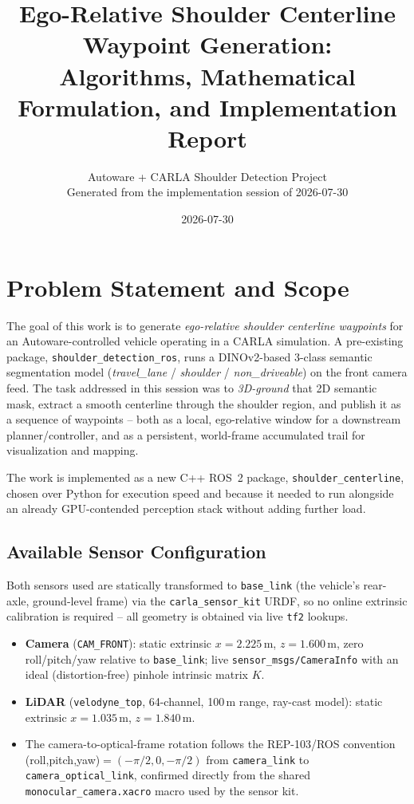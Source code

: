 \documentclass[11pt]{article}
\title{Ego-Relative Shoulder Centerline Waypoint Generation:\\
Algorithms, Mathematical Formulation, and Implementation Report}
\author{Autoware + CARLA Shoulder Detection Project \\ \small Generated from the implementation session of 2026-07-30}
\date{2026-07-30}
\newcommand{\code}[1]{\texttt{#1}}
\begin{document}
\maketitle
\tableofcontents

\section{Problem Statement and Scope}

The goal of this work is to generate \emph{ego-relative shoulder centerline waypoints} for an
Autoware-controlled vehicle operating in a CARLA simulation. A pre-existing package,
\code{shoulder\_detection\_ros}, runs a DINOv2-based 3-class semantic segmentation model
(\emph{travel\_lane} / \emph{shoulder} / \emph{non\_driveable}) on the front camera feed. The task
addressed in this session was to \emph{3D-ground} that 2D semantic mask, extract a smooth
centerline through the shoulder region, and publish it as a sequence of waypoints -- both as a
local, ego-relative window for a downstream planner/controller, and as a persistent, world-frame
accumulated trail for visualization and mapping.

The work is implemented as a new C++ ROS~2 package, \code{shoulder\_centerline}, chosen over Python
for execution speed and because it needed to run alongside an already GPU-contended perception
stack without adding further load.

\subsection{Available Sensor Configuration}

Both sensors used are statically transformed to \code{base\_link} (the vehicle's rear-axle,
ground-level frame) via the \code{carla\_sensor\_kit} URDF, so no online extrinsic calibration is
required -- all geometry is obtained via live \code{tf2} lookups.

\begin{itemize}[leftmargin=1.4em]
  \item \textbf{Camera} (\code{CAM\_FRONT}): static extrinsic $x{=}2.225\,\mathrm{m}$,
  $z{=}1.600\,\mathrm{m}$, zero roll/pitch/yaw relative to \code{base\_link}; live
  \code{sensor\_msgs/CameraInfo} with an ideal (distortion-free) pinhole intrinsic matrix $K$.
  \item \textbf{LiDAR} (\code{velodyne\_top}, 64-channel, 100\,m range, ray-cast model): static
  extrinsic $x{=}1.035\,\mathrm{m}$, $z{=}1.840\,\mathrm{m}$.
  \item The camera-to-optical-frame rotation follows the REP-103/ROS convention
  (roll,pitch,yaw)$=(-\pi/2,0,-\pi/2)$ from \code{camera\_link} to \code{camera\_optical\_link},
  confirmed directly from the shared \code{monocular\_camera.xacro} macro used by the sensor kit.
\end{itemize}
\end{document}
